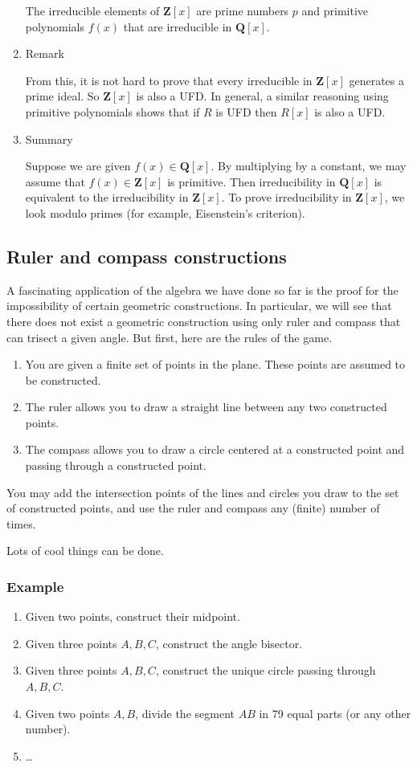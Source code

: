 \documentclass[11pt]{article}
\begin{document}
\begin{enumerate}
The irreducible elements of \(\mathbf{Z}[x]\) are prime numbers \(p\) and primitive polynomials \(f(x)\) that are irreducible in \(\mathbf{Q}[x]\).
\item Remark
\label{sec:orgbe43e70}

From this, it is not hard to prove that every irreducible in \(\mathbf{Z}[x]\) generates a prime ideal.
So \(\mathbf{Z}[x]\) is also a UFD.  
In general, a similar reasoning using primitive polynomials shows that if \(R\) is UFD then \(R[x]\) is also a UFD.
\item Summary
\label{sec:org36724ab}

Suppose we are given \(f(x) \in \mathbf{Q}[x]\).
By multiplying by a constant, we may assume that \(f(x) \in \mathbf{Z}[x]\) is primitive.
Then irreducibility in \(\mathbf{Q}[x]\) is equivalent to the irreducibility in \(\mathbf{Z}[x]\).
To prove irreducibility in \(\mathbf{Z}[x]\), we look modulo primes (for example, Eisenstein's criterion).
\end{enumerate}
\subsection{Ruler and compass constructions}
\label{sec:org1f2c5ec}
A fascinating application of the algebra we have done so far is the proof for the impossibility of certain geometric constructions.
In particular, we will see that there does not exist a geometric construction using only ruler and compass that can trisect a given angle.
But first, here are the rules of the game.

\begin{enumerate}
\item You are given a finite set of points in the plane.  These points are assumed to be constructed.
\item The ruler allows you to draw a straight line between any two constructed points.
\item The compass allows you to draw a circle centered at a constructed point and passing through a constructed point.
\end{enumerate}

You may add the intersection points of the lines and circles you draw to the set of constructed points, and use the ruler and compass any (finite) number of times.

Lots of cool things can be done.  
\subsubsection{Example}
\label{sec:orgaf608fa}
\begin{enumerate}
\item Given two points, construct their midpoint.
\item Given three points \(A, B, C\), construct the angle bisector.
\item Given three points \(A, B, C\), construct the unique circle passing through \(A, B, C\).
\item Given two points \(A, B\), divide the segment \(AB\) in 79 equal parts (or any other number).
\item \ldots{}
\end{enumerate}
\end{document}
